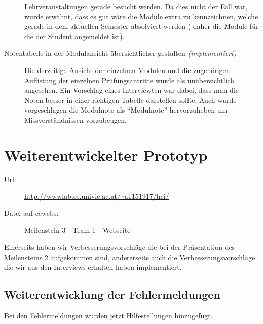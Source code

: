 \documentclass[a4paper,10pt]{scrartcl}
\begin{document}
\begin{description}
 Lehrveranstaltungen gerade besucht werden. Da dies nicht der Fall war, wurde erwähnt, dass es gut wäre die Module extra zu kennzeichnen, welche gerade in dem aktuellen Semester absolviert werden (
 daher die Module für die der Student angemeldet ist).
 \item[Notentabelle in der Modulansicht übersichtlicher gestalten \textit{(implementiert)}] Die derzeitige Ansicht der einzelnen Modulen und die zugehörigen Auflistung der einzelnen Prüfungsantritte wurde als unübersichtlich angesehen. Ein Vorschlag eines
 Interviewten war dabei, dass man die Noten besser in einer richtigen Tabelle darstellen sollte. Auch wurde vorgeschlagen die Modulnote als ``Modulnote'' hervorzuheben um Missverständnissen vorzubeugen.
 
 
\end{description}

\section{Weiterentwickelter Prototyp}

\begin{description}
 \item[Url:] \url{http://wwwlab.cs.univie.ac.at/~a1151917/hci/}
 \item[Datei auf cewebs:]Meilenstein 3 - Team 1 - Webseite
\end{description}

Einerseits haben wir Verbesserungsvorschläge die bei der Präsentation des Meilensteins 2 aufgekommen sind, andererseits auch
die Verbesserungsvorschläge die wir aus den Interviews erhalten haben implementiert.

\subsection{Weiterentwicklung der Fehlermeldungen}

Bei den Fehlermeldungen wurden jetzt Hilfestellungen hinzugefügt.

\noindent{}
\medskip
\end{document}
